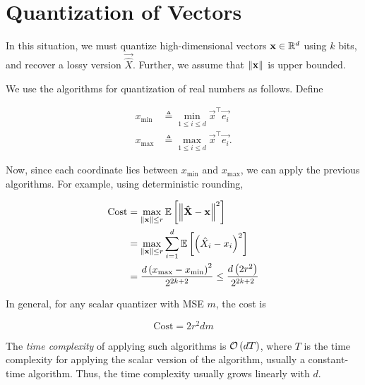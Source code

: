 \documentclass[twoside]{article}
\begin{document}



\section{Quantization of Vectors}

In this situation, we must quantize high-dimensional vectors \(\boldsymbol{\mathbf{x}}\in\mathbb R^d\)
using \(k\) bits, and recover a lossy version \(\vec{\hat{X}}\). Further, we
assume that \(\left\lVert\boldsymbol{\mathbf{x}}\right\rVert\) is upper bounded.

We use the algorithms for quantization of real numbers as follows. Define

\begin{align}
    x_{\mathrm{min}} &\triangleq \min_{1\le i\le d}\vec{x}^\top\vec{e_i} \\
    x_{\mathrm{max}} &\triangleq \max_{1\le i\le d}\vec{x}^\top\vec{e_i}.
    \label{eq:x-min-max-def}
\end{align}

Now, since each coordinate lies between \(x_{\mathrm{min}}\) and
\(x_{\mathrm{max}}\), we can apply the previous algorithms. For example, using
deterministic rounding,

\begin{align}
    \mathrm{Cost} &= \max_{\left\lVert\boldsymbol{\mathbf{x}}\right\rVert \le r} \mathbb{E}\left[ \left\lVert\boldsymbol{\mathbf{\hat{X}}}-\boldsymbol{\mathbf{x}}\right\rVert^2 \right] \\
                  &= \max_{\left\lVert\boldsymbol{\mathbf{x}}\right\rVert \le r} \sum_{i=1}^d\mathbb{E}\left[ \left(\hat{X}_i-x_i\right)^2 \right] \\
                  &= \frac{d\left(x_{\mathrm{max}}-x_{\mathrm{min}}\right)^2}{2^{2k+2}} \le \frac{d\left(2r^2\right)}{2^{2k+2}}
                      \label{eq:det-cost}
\end{align}

In general, for any scalar quantizer with MSE \(m\), the cost is

\begin{equation}
    \mathrm{Cost} = 2r^2dm
    \label{eq:cost-scalar}
\end{equation}

The \emph{time complexity} of applying such algorithms is \(\mathcal O\left(dT\right)\),
where \(T\) is the time complexity for applying the scalar version of the
algorithm, usually a constant-time algorithm. Thus, the time complexity usually
grows linearly with \(d\).
\end{document}
